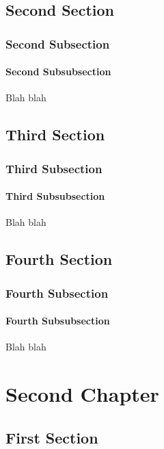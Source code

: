 \documentclass[11pt]{book}
\begin{document}
\section{Second Section}

\subsection{Second Subsection}

\subsubsection{Second Subsubsection}

Blah blah

\section{Third Section}

\subsection{Third Subsection}

\subsubsection{Third Subsubsection}

Blah blah

\section{Fourth Section}

\subsection{Fourth Subsection}

\subsubsection{Fourth Subsubsection}

Blah blah

\chapter{Second Chapter}

\section{First Section}
\end{document}
